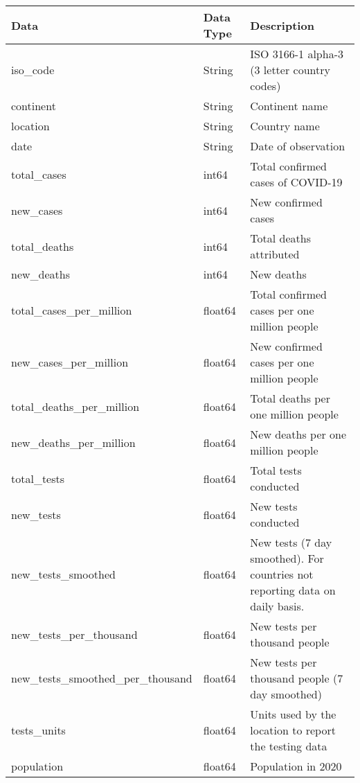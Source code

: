 \documentclass[10pt]{article}
\begin{document}
\begin{table}[htbp]
    \centering
	\begin{tabular}{|l|l|p{8cm}|}
		\hline
		\textbf{Data} & \textbf{Data Type} & \textbf{Description} \\
        \hline \hline
        iso\_code & String & ISO 3166-1 alpha-3 (3 letter country codes) \\
        \hline
        continent & String & Continent name \\
        \hline
        location & String & Country name \\
        \hline
        date & String & Date of observation \\
        \hline
        total\_cases & int64 & Total confirmed cases of COVID-19 \\
        \hline
        new\_cases & int64 & New confirmed cases  \\
        \hline
        total\_deaths & int64 & Total deaths attributed \\
        \hline
        new\_deaths & int64 & New deaths \\
        \hline
        total\_cases\_per\_million & float64 & Total confirmed cases per one million people \\
        \hline
        new\_cases\_per\_million & float64 & New confirmed cases per one million people  \\
        \hline
        total\_deaths\_per\_million & float64 & Total deaths per one million people \\
        \hline
        new\_deaths\_per\_million & float64 & New deaths per one million people \\
        \hline
        total\_tests & float64 & Total tests conducted \\
        \hline
        new\_tests & float64 & New tests conducted \\
        \hline
        new\_tests\_smoothed & float64 & New tests (7 day smoothed). For countries not reporting data on daily basis. \\
        \hline
        new\_tests\_per\_thousand & float64 & New tests per thousand people \\
        \hline
        new\_tests\_smoothed\_per\_thousand & float64 & New tests per thousand people (7 day smoothed) \\
        \hline
        tests\_units & float64 & Units used by the location to report the testing data \\
        \hline
        population & float64 & Population in 2020 \\

\end{tabular}
\end{table}
\end{document}

